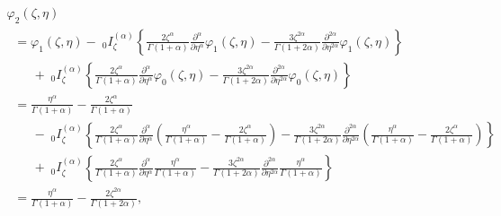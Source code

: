 \documentclass[10pt]{NSP1}
\begin{document}
\begin{equation}
\label{eq45}
\begin{array}{llllll}
 \varphi _2 \left( {\zeta ,\eta } \right)\\
\;\;=\varphi _1 \left( {\zeta ,\eta }
\right)-\;_0I_\zeta ^{\left( \alpha \right)}\left\{ {\frac{2\zeta
^\alpha }{\Gamma \left( {1+\alpha } \right)}\frac{\partial ^\alpha
}{\partial \eta ^\alpha }\varphi _1 \left( {\zeta ,\eta }
\right)-\frac{3\zeta ^{2\alpha }}{\Gamma \left( {1+2\alpha }
\right)}\frac{\partial ^{2\alpha }}{\partial \eta ^{2\alpha }}\varphi _1
\left( {\zeta ,\eta } \right)} \right\} \\
\qquad +\;_0I_\zeta ^{\left( \alpha \right)}\left\{ {\frac{2\zeta ^\alpha
}{\Gamma \left( {1+\alpha } \right)}\frac{\partial ^\alpha }{\partial \eta
^\alpha }\varphi _0 \left( {\zeta ,\eta } \right)-\frac{3\zeta ^{2\alpha
}}{\Gamma \left( {1+2\alpha } \right)}\frac{\partial ^{2\alpha }}{\partial
\eta ^{2\alpha }}\varphi _0 \left( {\zeta ,\eta } \right)} \right\} \\
\;\; =\frac{\eta ^\alpha }{\Gamma \left( {1+\alpha } \right)}-\frac{2\zeta
^\alpha }{\Gamma \left( {1+\alpha } \right)} \\
\qquad -\;_0I_\zeta ^{\left( \alpha \right)}\left\{ {\frac{2\zeta ^\alpha
}{\Gamma \left( {1+\alpha } \right)}\frac{\partial ^\alpha }{\partial \eta
^\alpha }\left( {\frac{\eta ^\alpha }{\Gamma \left( {1+\alpha }
\right)}-\frac{2\zeta ^\alpha }{\Gamma \left( {1+\alpha } \right)}}
\right)-\frac{3\zeta ^{2\alpha }}{\Gamma \left( {1+2\alpha }
\right)}\frac{\partial ^{2\alpha }}{\partial \eta ^{2\alpha }}\left(
{\frac{\eta ^\alpha }{\Gamma \left( {1+\alpha } \right)}-\frac{2\zeta
^\alpha }{\Gamma \left( {1+\alpha } \right)}} \right)} \right\} \\
\qquad  +\;_0I_\zeta ^{\left( \alpha \right)}\left\{ {\frac{2\zeta ^\alpha
}{\Gamma \left( {1+\alpha } \right)}\frac{\partial ^\alpha }{\partial \eta
^\alpha }\frac{\eta ^\alpha }{\Gamma \left( {1+\alpha }
\right)}-\frac{3\zeta ^{2\alpha }}{\Gamma \left( {1+2\alpha }
\right)}\frac{\partial ^{2\alpha }}{\partial \eta ^{2\alpha }}\frac{\eta
^\alpha }{\Gamma \left( {1+\alpha } \right)}} \right\} \\
\;\; =\frac{\eta ^\alpha }{\Gamma \left( {1+\alpha } \right)}-\frac{2\zeta
^{2\alpha }}{\Gamma \left( {1+2\alpha } \right)},
 \end{array}
\end{equation}
\end{document}
